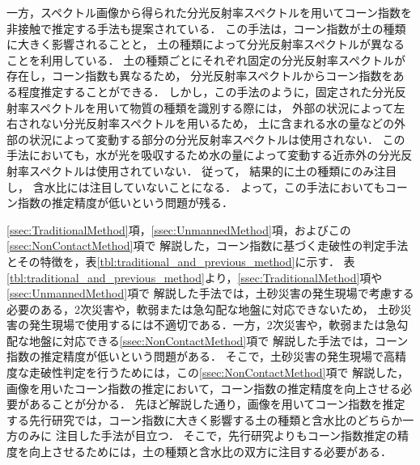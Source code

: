 一方，スペクトル画像から得られた分光反射率スペクトルを用いてコーン指数を非接触で推定する手法も提案されている\cite{Kruse2000}\cite{Sopher2016}．
この手法は，コーン指数が土の種類に大きく影響されることと，
土の種類によって分光反射率スペクトルが異なることを利用している．
土の種類ごとにそれぞれ固定の分光反射率スペクトルが存在し，コーン指数も異なるため，
分光反射率スペクトルからコーン指数をある程度推定することができる．
しかし，この手法のように，固定された分光反射率スペクトルを用いて物質の種類を識別する際には，
外部の状況によって左右されない分光反射率スペクトルを用いるため，
土に含まれる水の量などの外部の状況によって変動する部分の分光反射率スペクトルは使用されない\cite{Shaw2003}．
この手法においても，水が光を吸収するため水の量によって変動する近赤外の分光反射率スペクトルは使用されていない．
従って，
結果的に土の種類にのみ注目し，
含水比には注目していないことになる．
よって，この手法においてもコーン指数の推定精度が低いという問題が残る．

\ref{ssec:TraditionalMethod}項，\ref{ssec:UnmannedMethod}項，およびこの\ref{ssec:NonContactMethod}項で
解説した，コーン指数に基づく走破性の判定手法とその特徴を，表\ref{tbl:traditional_and_previous_method}に示す．
表\ref{tbl:traditional_and_previous_method}より，\ref{ssec:TraditionalMethod}項や\ref{ssec:UnmannedMethod}項で
解説した手法では，土砂災害の発生現場で考慮する必要のある，2次災害や，軟弱または急勾配な地盤に対応できないため，
土砂災害の発生現場で使用するには不適切である．一方，2次災害や，軟弱または急勾配な地盤に対応できる\ref{ssec:NonContactMethod}項で
解説した手法では，コーン指数の推定精度が低いという問題がある．
そこで，土砂災害の発生現場で高精度な走破性判定を行うためには，この\ref{ssec:NonContactMethod}項で
解説した，画像を用いたコーン指数の推定において，コーン指数の推定精度を向上させる必要があることが分かる．
先ほど解説した通り，画像を用いてコーン指数を推定する先行研究では，コーン指数に大きく影響する土の種類と含水比のどちらか一方のみに
注目した手法が目立つ．
そこで，先行研究よりもコーン指数推定の精度を向上させるためには，土の種類と含水比の双方に注目する必要がある．

